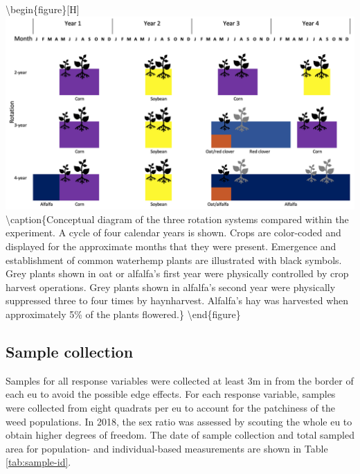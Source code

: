\documentclass[
]{article}
\begin{document}
\textbackslash begin\{figure\}{[}H{]}
\includegraphics[width=1\linewidth]{concept} \textbackslash caption\{Conceptual diagram of the three rotation systems compared within the experiment. A cycle of four calendar years is shown. Crops are color-coded and displayed for the approximate months that they were present. Emergence and establishment of common waterhemp plants are illustrated with black symbols. Grey plants shown in oat or alfalfa's first year were physically controlled by crop harvest operations. Grey plants shown in alfalfa's second year were physically suppressed three to four times by haynharvest. Alfalfa's hay was harvested when approximately 5\% of the plants flowered.\}\label{fig:concept}
\textbackslash end\{figure\}

\hypertarget{sample-collection}{%
\subsection*{Sample collection}\label{sample-collection}}

Samples for all response variables were collected at least 3m in from the border of each eu to avoid the possible edge effects.
For each response variable, samples were collected from eight quadrats per eu to account for the patchiness of the weed populations. In 2018, the sex ratio was assessed by scouting the whole eu to obtain higher degrees of freedom.
The date of sample collection and total sampled area for population- and individual-based measurements are shown in Table \ref{tab:sample-id}.
\end{document}
